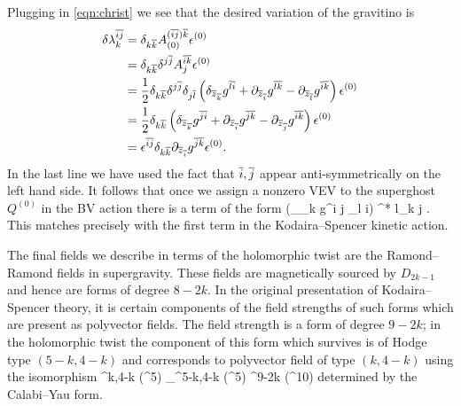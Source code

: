\documentclass[../main.tex]{subfiles}
\begin{document}
Plugging in \eqref{eqn:christ} we see that the desired variation of the gravitino is
\begin{align*}
\delta \lambda_k^{\overline i \overline j} & = \delta_{k \overline k} A_{(0)}^{(\overline i \overline j) \overline k} {\epsilon}^{(0)} \\
& = \delta_{k \overline k} \delta^{j \overline j} A_{j}^{\overline i \overline k} {\epsilon}^{(0)} \\
& = \frac12 \delta_{k \overline k} \delta^{j \overline j} \delta_{j \overline l} \left(\delta_{{\overline{z}}_{\overline k}} g^{\overline l \overline i} + \partial_{{\overline{z}}_{\overline i}} g^{\overline l \overline k} - \partial_{{\overline{z}}_{\overline l}} g^{\overline i \overline k} \right) {\epsilon}^{(0)} \\
& = \frac12 \delta_{k \overline k} \left(\delta_{{\overline{z}}_{\overline k}} g^{\overline j \overline i} + \partial_{{\overline{z}}_{\overline i}} g^{\overline j \overline k} - \partial_{{\overline{z}}_{\overline j}} g^{\overline i \overline k} \right) {\epsilon}^{(0)} \\ & = {\epsilon}^{\overline i \overline j} \delta_{k \overline k} \partial_{{\overline{z}}_{\overline i}} g^{\overline j \overline k} {\epsilon}^{(0)} .
\end{align*}
In the last line we have used the fact that $\overline i, \overline j$ appear anti-symmetrically on the left hand side.
It follows that once we assign a nonzero VEV to the superghost $Q^{(0)}$ in the BV action there is a term of the form
\beqn
(\del_{\zbar_{\br k}} g^{\br i \br j} \delta_{l \br i}) \lambda^{* l}_{\br k \br j} .
\eeqn
This matches precisely with the first term in the Kodaira--Spencer kinetic action.

The final fields we describe in terms of the holomorphic twist are the Ramond--Ramond fields in supergravity.
These fields are magnetically sourced by $D_{2k-1}$ and hence are forms of degree $8-2k$.
In the original presentation of Kodaira--Spencer theory, it is certain components of the field strengths of such forms which are present as polyvector fields.
The field strength is a form of degree $9-2k$; in the holomorphic twist the component of this form which survives is of Hodge type $(5-k,4-k)$ and corresponds to polyvector field of type $(k,4-k)$ using the isomorphism
\beqn
\PV^{k,4-k} (\C^5) \simeq_\Omega \Omega^{5-k,4-k} (\C^5) \subset \Omega^{9-2k} (\R^{10}) \otimes \C
\eeqn
determined by the Calabi--Yau form.
\end{document}

